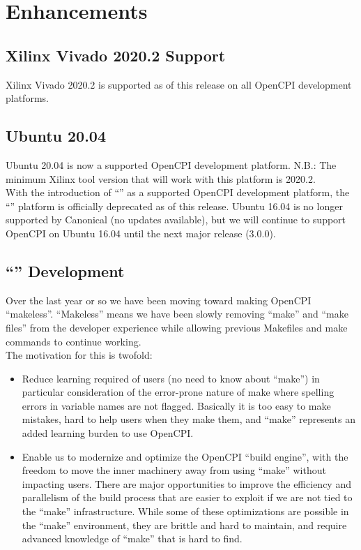 
\def\ocpiversion{v2.2.0}
\section{Enhancements}

\subsection{Xilinx Vivado 2020.2 Support}
\label{sec:22_vivado}
Xilinx Vivado 2020.2 is supported as of this release on all OpenCPI development platforms.

\subsection{Ubuntu 20.04}
\label{sec:22_ubuntu20}
Ubuntu 20.04 is now a supported OpenCPI development platform.  N.B.: The minimum Xilinx tool version that will work with this platform is 2020.2.\\

With the introduction of ``'' as a supported OpenCPI development platform, the ``'' platform is officially deprecated as of this release.  Ubuntu 16.04 is no longer supported by Canonical (no updates available), but we will continue to support OpenCPI on Ubuntu 16.04 until the next major release (3.0.0).

\subsection{``'' Development}
\label{sec:22_makeless}
Over the last year or so we have been moving toward making OpenCPI ``makeless''.  ``Makeless'' means we have been slowly removing ``make'' and ``make files'' from the developer experience while allowing previous Makefiles and make commands to continue working.\\

The motivation for this is twofold:\\

\begin{itemize}
\setlength\itemsep{0em} %
\item Reduce learning required of users (no need to know about ``make'') in particular consideration of the error-prone nature of make where spelling errors in variable names are not flagged.  Basically it is too easy to make mistakes, hard to help users when they make them, and ``make'' represents an added learning burden to use OpenCPI.
\item Enable us to modernize and optimize the OpenCPI ``build engine'', with the freedom to move the inner machinery away from using ``make'' without impacting users.  There are major opportunities to improve the efficiency and parallelism of the build process that are easier to exploit if we are not tied to the ``make'' infrastructure.  While some of these optimizations are possible in the ``make'' environment, they are brittle and hard to maintain, and require advanced knowledge of ``make'' that is hard to find.
\end{itemize}

